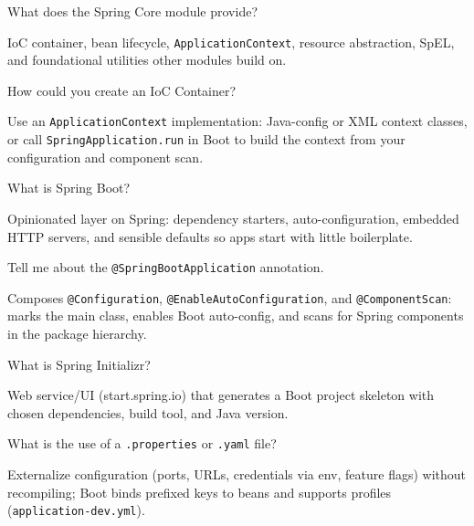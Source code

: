 \question[4]
What does the Spring Core module provide?
\makeemptybox{1.2in}
\begin{solution}
  IoC container, bean lifecycle, \texttt{ApplicationContext}, resource abstraction, SpEL, and foundational utilities other modules build on.
\end{solution}

\question[4]
How could you create an IoC Container?
\makeemptybox{1.2in}
\begin{solution}
  Use an \texttt{ApplicationContext} implementation: Java-config or XML context classes, or call \texttt{SpringApplication.run} in Boot to build the context from your configuration and component scan.
\end{solution}

\newpage


\question[4]
What is Spring Boot?
\makeemptybox{1.25in}
\begin{solution}
  Opinionated layer on Spring: dependency starters, auto-configuration, embedded HTTP servers, and sensible defaults so apps start with little boilerplate.
\end{solution}

\question[4]
Tell me about the \texttt{@SpringBootApplication} annotation.
\makeemptybox{1.35in}
\begin{solution}
  Composes \texttt{@Configuration}, \texttt{@EnableAutoConfiguration}, and \texttt{@ComponentScan}: marks the main class, enables Boot auto-config, and scans for Spring components in the package hierarchy.
\end{solution}

\question[4]
What is Spring Initializr?
\makeemptybox{1.1in}
\begin{solution}
  Web service/UI (start.spring.io) that generates a Boot project skeleton with chosen dependencies, build tool, and Java version.
\end{solution}

\question[4]
What is the use of a \texttt{.properties} or \texttt{.yaml} file?
\makeemptybox{1.35in}
\begin{solution}
  Externalize configuration (ports, URLs, credentials via env, feature flags) without recompiling; Boot binds prefixed keys to beans and supports profiles (\texttt{application-dev.yml}).
\end{solution}

